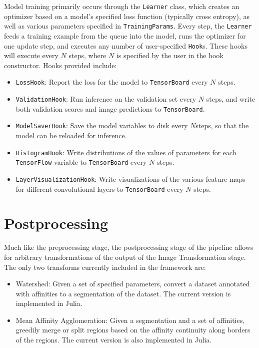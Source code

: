 Model training primarily occurs through the \texttt{Learner} class, which creates an optimizer based on a model's specified loss function (typically cross entropy), as well as various parameters specified in \texttt{TrainingParams}. Every step, the \texttt{Learner} feeds a training example from the queue into the model, runs the optimizer for one update step, and executes any number of user-specified \texttt{Hook}s. These hooks will execute every $N$ steps, where $N$ is specified by the user in the hook constructor. Hooks provided include:

\begin{itemize}
	\item \texttt{LossHook}: Report the loss for the model to \texttt{TensorBoard} every $N$ steps.
	\item \texttt{ValidationHook}: Run inference on the validation set every $N$ steps, and write both validation scores and image predictions to \texttt{TensorBoard}.
	\item \texttt{ModelSaverHook}: Save the model variables to disk every $N$steps, so that the model can be reloaded for inference.
	\item \texttt{HistogramHook}: Write distributions of the values of parameters for each \texttt{TensorFlow} variable to \texttt{TensorBoard} every $N$ steps.
	\item \texttt{LayerVisualizationHook}: Write visualizations of the various feature maps for different convolutional layers to \texttt{TensorBoard} every $N$ steps.
\end{itemize}

\section{Postprocessing}

Much like the preprocessing stage, the postprocessing stage of the pipeline allows for arbitrary transformations of the output of the Image Transformation stage. The only two transforms currently included in the framework are:

\begin{itemize}
	\item Watershed: Given a set of specified parameters, convert a dataset annotated with affinities to a segmentation of the dataset. The current version is implemented in Julia.
	\item Mean Affinity Agglomeration: Given a segmentation and a set of affinities, greedily merge or split regions based on the affinity continuity along borders of the regions. The current version is also implemented in Julia.
\end{itemize}


